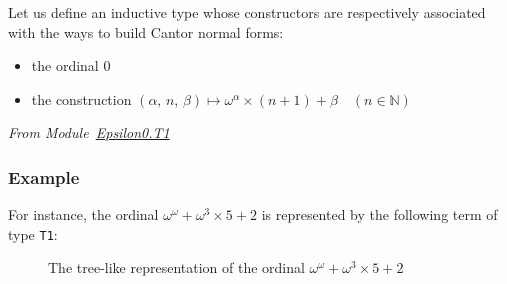 

    Let us define an inductive type whose 
constructors are respectively associated
with the ways to build Cantor normal forms:

\begin{itemize}
\item the ordinal \(0\)
\item the construction \((\alpha,\, n,\,\beta)  \mapsto \omega^\alpha \times (n + 1)+ \beta \quad (n\in\mathbb{N})\)
\end{itemize}


\vspace{4pt}
\noindent\emph{From Module~\href{../theories/html/hydras.Epsilon0.T1.html\#T1}{Epsilon0.T1}}

\label{types:T1}



\subsubsection{Example}

\label{alpha0-def}
For instance, the ordinal  $\omega^\omega+\omega^3\times 5+2$ is represented by the following term of type \texttt{T1}:





\begin{figure}[htb]
\centering
{}

\caption{The tree-like representation of the ordinal $\omega^\omega+\omega^3\times 5 +2$\label{fig:cnf-tree}}

\end{figure}



